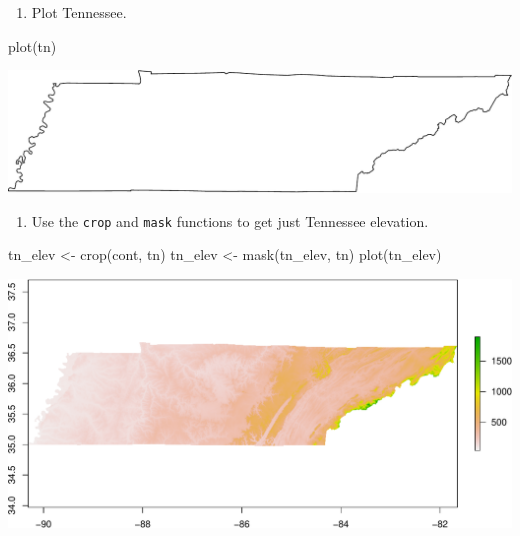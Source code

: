 \documentclass[
]{book}
\newenvironment{Shaded}{\begin{snugshade}}{\end{snugshade}}
\newcommand{\FunctionTok}[1]{\textcolor[rgb]{0.00,0.00,0.00}{#1}}
\newcommand{\NormalTok}[1]{#1}
\newcommand{\OtherTok}[1]{\textcolor[rgb]{0.56,0.35,0.01}{#1}}
\newcommand{\SpecialCharTok}[1]{\textcolor[rgb]{0.00,0.00,0.00}{#1}}
\newcommand{\StringTok}[1]{\textcolor[rgb]{0.31,0.60,0.02}{#1}}
\providecommand{\tightlist}{%
  \setlength{\itemsep}{0pt}\setlength{\parskip}{0pt}}
\begin{document}
\begin{Shaded}
\end{Shaded}

\begin{enumerate}
\def\labelenumi{\arabic{enumi}.}
\setcounter{enumi}{13}
\tightlist
\item
  Plot Tennessee.
\end{enumerate}

\begin{Shaded}
\begin{Highlighting}[]
\FunctionTok{plot}\NormalTok{(tn)}
\end{Highlighting}
\end{Shaded}

\includegraphics{figures/unnamed-chunk-422-1.pdf}

\begin{enumerate}
\def\labelenumi{\arabic{enumi}.}
\setcounter{enumi}{14}
\tightlist
\item
  Use the \texttt{crop} and \texttt{mask} functions to get just Tennessee elevation.
\end{enumerate}

\begin{Shaded}
\begin{Highlighting}[]
\NormalTok{tn\_elev }\OtherTok{\textless{}{-}} \FunctionTok{crop}\NormalTok{(cont, tn)}
\NormalTok{tn\_elev }\OtherTok{\textless{}{-}} \FunctionTok{mask}\NormalTok{(tn\_elev, tn)}
\FunctionTok{plot}\NormalTok{(tn\_elev)}
\end{Highlighting}
\end{Shaded}

\includegraphics{figures/unnamed-chunk-423-1.pdf}
\end{document}
